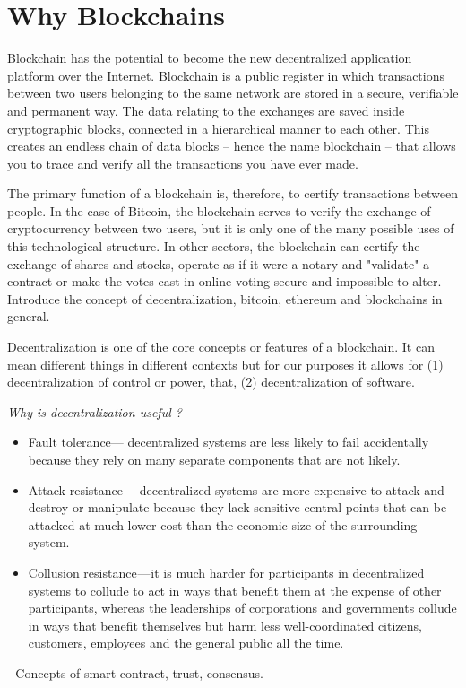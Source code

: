 \section{Why Blockchains}\label{sec:blockchain}

Blockchain has the potential to become the new decentralized application platform over the Internet. Blockchain is a
public register in which transactions between two users belonging to the same network are stored in a secure, verifiable
and permanent way. The data relating to the exchanges are saved inside cryptographic blocks, connected in a hierarchical
manner to each other. This creates an endless chain of data blocks -- hence the name blockchain -- that allows you to
trace and verify all the transactions you have ever made.


 The primary function of a blockchain is, therefore, to certify transactions between people. In the case of Bitcoin, the
 blockchain serves to verify the exchange of cryptocurrency between two users, but it is only one of the many possible
 uses of this technological structure. In other sectors, the blockchain can certify the exchange of shares and stocks,
 operate as if it were a notary and "validate" a contract or make the votes cast in online voting secure and impossible
 to alter.
- Introduce the concept of decentralization, bitcoin, ethereum and blockchains in general.

Decentralization is one of the core concepts or features of a blockchain. It can mean different things in different
contexts but for our purposes it allows for (1) decentralization of control or power, that, (2) decentralization of
software.

{\em Why is decentralization useful ?}
\begin{itemize}

    \item Fault tolerance— decentralized systems are less likely to fail accidentally because they rely on many separate
components that are not likely.
    \item Attack resistance— decentralized systems are more expensive to attack and destroy or manipulate because they lack
sensitive central points that can be attacked at much lower cost than the economic size of the surrounding system.
    \item Collusion resistance — it is much harder for participants in decentralized systems to collude to act in ways that
benefit them at the expense of other participants, whereas the leaderships of corporations and governments collude in
ways that benefit themselves but harm less well-coordinated citizens, customers, employees and the general public all
the time.

\end{itemize}
- Concepts of smart contract, trust, consensus.

